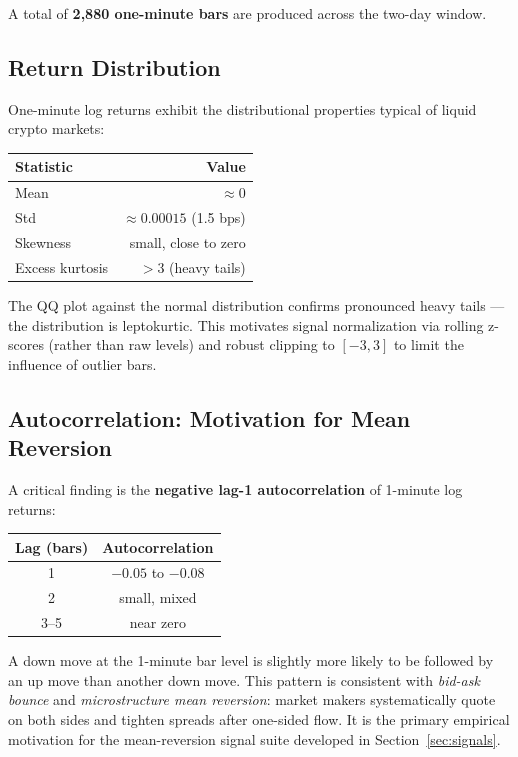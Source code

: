 \documentclass[11pt, a4paper]{article}
\begin{document}
A total of \textbf{2{,}880 one-minute bars} are produced across the two-day window.

\subsection{Return Distribution}

One-minute log returns exhibit the distributional properties typical of
liquid crypto markets:

\begin{center}
\begin{tabular}{lr}
\toprule
\textbf{Statistic} & \textbf{Value} \\
\midrule
Mean   & $\approx 0$ \\
Std    & $\approx 0.00015$ (1.5 bps) \\
Skewness  & small, close to zero \\
Excess kurtosis & $> 3$ (heavy tails) \\
\bottomrule
\end{tabular}
\end{center}

The QQ plot against the normal distribution confirms pronounced heavy tails ---
the distribution is leptokurtic.  This motivates signal normalization via rolling
z-scores (rather than raw levels) and robust clipping to $[-3, 3]$ to limit
the influence of outlier bars.

\subsection{Autocorrelation: Motivation for Mean Reversion}

A critical finding is the \textbf{negative lag-1 autocorrelation} of 1-minute
log returns:

\begin{center}
\begin{tabular}{cc}
\toprule
\textbf{Lag (bars)} & \textbf{Autocorrelation} \\
\midrule
1 & $-0.05$ to $-0.08$ \\
2 & small, mixed \\
3--5 & near zero \\
\bottomrule
\end{tabular}
\end{center}

A down move at the 1-minute bar level is slightly more likely to be followed
by an up move than another down move.  This pattern is consistent with
\textit{bid-ask bounce} and \textit{microstructure mean reversion}: market
makers systematically quote on both sides and tighten spreads after one-sided
flow.  It is the primary empirical motivation for the mean-reversion signal
suite developed in Section~\ref{sec:signals}.
\end{document}
